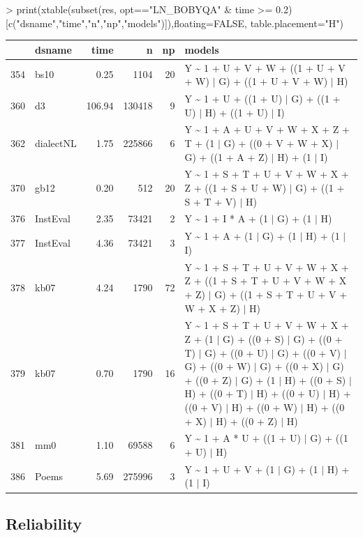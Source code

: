 \documentclass[article]{jss}
\begin{document}
\begin{Schunk}
\begin{Sinput}
> print(xtable(subset(res, opt=="LN_BOBYQA" & time >= 0.2)[c("dsname","time","n","np","models")]),floating=FALSE, table.placement="H")
\end{Sinput}
\begin{tabular}{rlrrrl}
  \hline
 & dsname & time & n & np & models \\ 
  \hline
354 & bs10 & 0.25 & 1104 &  20 & Y \~{} 1 + U + V + W + ((1 + U + V + W) $|$ G) + ((1 + U + V + W) $|$ H) \\ 
  360 & d3 & 106.94 & 130418 &   9 & Y \~{} 1 + U + ((1 + U) $|$ G) + ((1 + U) $|$ H) + ((1 + U) $|$ I) \\ 
  362 & dialectNL & 1.75 & 225866 &   6 & Y \~{} 1 + A + U + V + W + X + Z + T + (1 $|$ G) + ((0 + V + W + X) $|$ G) + ((1 + A + Z) $|$ H) + (1 $|$ I) \\ 
  370 & gb12 & 0.20 & 512 &  20 & Y \~{} 1 + S + T + U + V + W + X + Z + ((1 + S + U + W) $|$ G) + ((1 + S + T + V) $|$ H) \\ 
  376 & InstEval & 2.35 & 73421 &   2 & Y \~{} 1 + I * A + (1 $|$ G) + (1 $|$ H) \\ 
  377 & InstEval & 4.36 & 73421 &   3 & Y \~{} 1 + A + (1 $|$ G) + (1 $|$ H) + (1 $|$ I) \\ 
  378 & kb07 & 4.24 & 1790 &  72 & Y \~{} 1 + S + T + U + V + W + X + Z + ((1 + S + T + U + V + W + X + Z) $|$ G) + ((1 + S + T + U + V + W + X + Z) $|$ H) \\ 
  379 & kb07 & 0.70 & 1790 &  16 & Y \~{} 1 + S + T + U + V + W + X + Z + (1 $|$ G) + ((0 + S) $|$ G) + ((0 + T) $|$ G) + ((0 + U) $|$ G) + ((0 + V) $|$ G) + ((0 + W) $|$ G) + ((0 + X) $|$ G) + ((0 + Z) $|$ G) + (1 $|$ H) + ((0 + S) $|$ H) + ((0 + T) $|$ H) + ((0 + U) $|$ H) + ((0 + V) $|$ H) + ((0 + W) $|$ H) + ((0 + X) $|$ H) + ((0 + Z) $|$ H) \\ 
  381 & mm0 & 1.10 & 69588 &   6 & Y \~{} 1 + A * U + ((1 + U) $|$ G) + ((1 + U) $|$ H) \\ 
  386 & Poems & 5.69 & 275996 &   3 & Y \~{} 1 + U + V + (1 $|$ G) + (1 $|$ H) + (1 $|$ I) \\ 
   \hline
\end{tabular}\end{Schunk}






\subsection[Reliablility]{Reliability}
\end{document}
